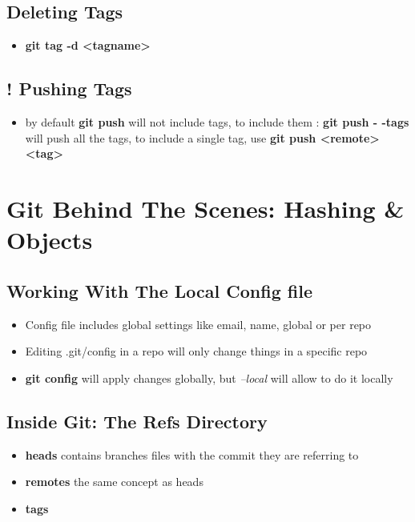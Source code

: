 \documentclass{report}
\newcommand{\warning}{
	{\fontencoding{U}\fontfamily{futs}\selectfont\char 66\relax}
}
\begin{document}
\section{Deleting Tags}

\begin{itemize}
	\item \textbf{git tag -d <tagname>} 
\end{itemize}

\section{! Pushing Tags}

\begin{itemize}
	\item \warning by default \textbf{git push} will not include tags, to include them : \textbf{git push - -tags} will push all the tags, to include a single tag, use \textbf{git push <remote> <tag>} 
\end{itemize}


\chapter{Git Behind The Scenes: Hashing \& Objects}

\section{Working With The Local Config file}

\begin{itemize}
	\item Config file includes global settings like email, name, global or per repo 
	\item Editing .git/config in a repo will only change things in a specific repo 
	\item \textbf{git config} will apply changes globally, but \textit{--local} will allow to do it locally
\end{itemize}

\section{Inside Git: The Refs Directory}

\begin{itemize}
	\item \textbf{heads} contains branches files with the commit they are referring to
	\item \textbf{remotes} the same concept as heads
	\item \textbf{tags} 
\end{itemize}
\end{document}
